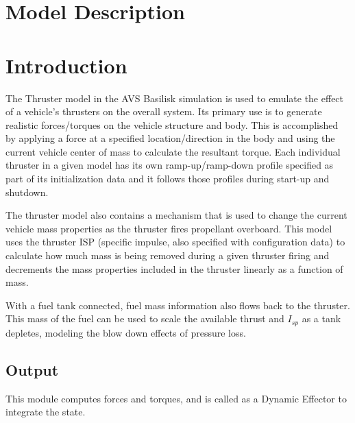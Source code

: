 \section{Model Description}

\section{Introduction}
The Thruster model in the AVS Basilisk simulation is used to emulate the effect
of a vehicle's thrusters on the overall system.  Its primary use is to generate
realistic forces/torques on the vehicle structure and body.  This is
accomplished by applying a force at a specified location/direction in the body and
using the current vehicle center of mass to calculate the resultant torque.
Each individual thruster in a given model has its own ramp-up/ramp-down profile
specified as part of its initialization data and it follows those profiles during
start-up and shutdown.

The thruster model also contains a mechanism that is used to change the current
vehicle mass properties as the thruster fires propellant overboard.  This model
uses the thruster ISP (specific impulse, also specified with configuration data)
to calculate how much mass is being removed during a given thruster firing and
decrements the mass properties included in the thruster linearly as a function
of mass.

With a fuel tank connected, fuel mass information also flows back to the thruster.
This mass of the fuel can be used to scale the available thrust and $I_{sp}$ as a tank
depletes, modeling the blow down effects of pressure loss.

\subsection{Output}

This module computes forces and torques, and is called as a Dynamic Effector to integrate the state.
